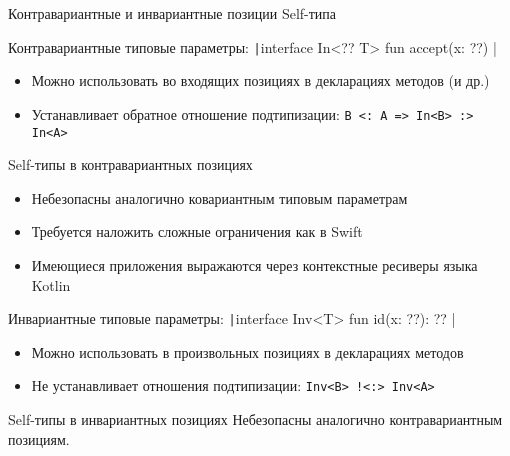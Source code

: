 \documentclass[aspectratio=169,usenames,dvipsnames]{beamer}
\begin{document}
    \begin{frame}{Контравариантные и инвариантные позиции Self-типа}
        \begin{block}{Контравариантные типовые параметры: \texttt|interface In<?? T> { fun accept(x: ??) }|}
            \begin{itemize}
                \item Можно использовать во входящих позициях в декларациях методов (и др.)
                \item Устанавливает обратное отношение подтипизации: \texttt{B <: A => In<B> :> In<A>}
            \end{itemize}
        \end{block}
        \pause
        \begin{block}{Self-типы в контравариантных позициях}
            \begin{itemize}
                \item Небезопасны аналогично ковариантным типовым параметрам
                \item Требуется наложить сложные ограничения как в Swift
                \item Имеющиеся приложения выражаются через контекстные ресиверы языка Kotlin
            \end{itemize}
        \end{block}
        \pause
        \begin{block}{Инвариантные типовые параметры: \texttt|interface Inv<T> { fun id(x: ??): ?? }|}
            \begin{itemize}
                \item Можно использовать в произвольных позициях в декларациях методов
                \item Не устанавливает отношения подтипизации: \texttt{Inv<B> !<:> Inv<A>}
            \end{itemize}
        \end{block}
        \pause
        \begin{block}{Self-типы в инвариантных позициях}
            Небезопасны аналогично контравариантным позициям.
        \end{block}
    \end{frame}
\end{document}
